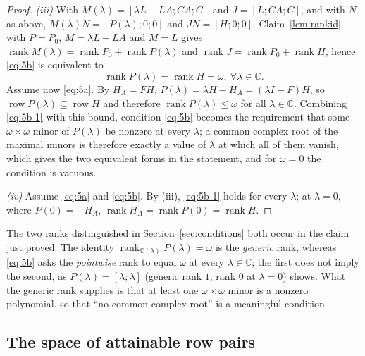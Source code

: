 \documentclass[journal]{IEEEtran}
\theoremstyle{plainn}
\theoremstyle{remark}
\begin{document}
\begin{proof}
\emph{(iii)} With $M(\lambda)=[\lambda L-LA;CA;C]$ and $J=[L;CA;C]$, and with $N$ as above,
$M(\lambda)N=[P(\lambda);0;0]$ and $JN=[H;0;0]$. Claim~\ref{lem:rankid} with $P=P_0$,
$M=\lambda L-LA$ and $M=L$ gives
$\operatorname{rank}M(\lambda)=\operatorname{rank}P_0+\operatorname{rank}P(\lambda)$ and
$\operatorname{rank}J=\operatorname{rank}P_0+\operatorname{rank}H$, hence \eqref{eq:5b} is equivalent
to
\begin{equation}\label{eq:5b-1}
\operatorname{rank}P(\lambda)=\operatorname{rank}H=\omega,\ \forall \lambda\in\mathbb C.
\end{equation}
Assume now \eqref{eq:5a}. By $H_A=FH$, $P(\lambda)=\lambda H-H_A=(\lambda I-F)H$, so
$\operatorname{row}P(\lambda)\subseteq\operatorname{row}H$ and therefore
$\operatorname{rank}P(\lambda)\le\omega$ for all $\lambda\in\mathbb C$. Combining \eqref{eq:5b-1} with
this bound, condition \eqref{eq:5b} becomes the requirement that some $\omega\times\omega$ minor of
$P(\lambda)$ be nonzero at every $\lambda$; a common complex root of the maximal minors is therefore
exactly a value of $\lambda$ at which all of them vanish, which gives the two equivalent forms in the
statement, and for $\omega=0$ the condition is vacuous.

\emph{(iv)} Assume \eqref{eq:5a} and \eqref{eq:5b}. By (iii), \eqref{eq:5b-1} holds for every
$\lambda$; at $\lambda=0$, where $P(0)=-H_A$,
$\operatorname{rank}H_A=\operatorname{rank}P(0)=\operatorname{rank}H$. \qedhere
\end{proof}

The two ranks distinguished in Section~\ref{sec:conditions} both occur in the claim just proved. The identity
$\operatorname{rank}_{\mathbb C(\lambda)}P(\lambda)=\omega$ is the \emph{generic} rank, whereas
\eqref{eq:5b} asks the \emph{pointwise} rank to equal $\omega$ at every $\lambda\in\mathbb C$; the
first does not imply the second, as $P(\lambda)=[\lambda;\lambda]$ (generic rank $1$, rank $0$ at
$\lambda=0$) shows. What the generic rank supplies is that at least one $\omega\times\omega$ minor is a
nonzero polynomial, so that ``no common complex root'' is a meaningful condition.

\subsection{The space of attainable row pairs}\label{sec:free}
\end{document}
